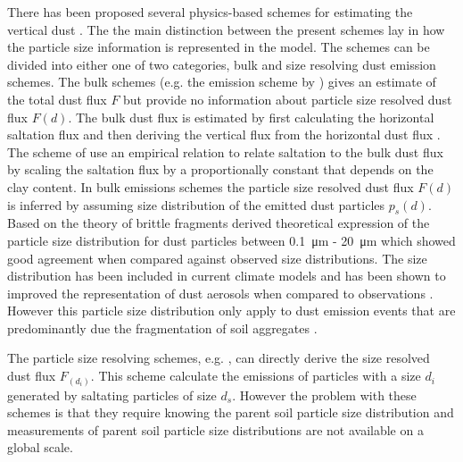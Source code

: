 There has been proposed several physics-based schemes for estimating the vertical dust \parencite{MB95_dust_emission,alfaro2001modeling,shao2004simplification}. The the main distinction between the present schemes lay in how the particle size information is represented in the model. The schemes can be divided into either one of two categories, bulk and size resolving dust emission schemes. The bulk schemes (e.g. the emission scheme by \parencite{MB95_dust_emission}) gives an estimate of the total dust flux $F$ but provide no information about particle size resolved dust flux $F(d)$. The bulk dust flux is estimated by first calculating the horizontal saltation flux and then deriving the vertical flux from the horizontal dust flux \parencite{tegen2014numerical}. The scheme of \textcite{MB95_dust_emission} use an empirical relation to relate saltation to the bulk dust flux by scaling the saltation flux by a proportionally constant that depends on the clay content. In bulk emissions schemes the particle size resolved dust flux $F(d)$ is inferred by assuming size distribution of the emitted dust particles $p_s(d)$. Based on the theory of brittle fragments \textcite{kok_scaling_2011} derived theoretical expression of the particle size distribution for dust particles between \SI{0.1}{\micro\metre} - \SI{20}{\micro\metre} which showed good agreement when compared against observed size distributions. The \textcite{kok_scaling_2011} size distribution has been included in current climate models and has been shown to improved the representation of dust aerosols when compared to observations \parencite{johnson2012global}. However this particle size distribution only apply to dust emission events that are predominantly due the fragmentation of soil aggregates \parencite{kok2012physics}.


The particle size resolving schemes, e.g. \textcite{shao2004simplification}, can directly derive the size resolved dust flux $F_(d_i)$. This scheme calculate the emissions of particles with a size $d_i$ generated by saltating particles of size $d_s$. However the problem with these schemes is that they require knowing the parent soil particle size distribution and measurements of parent soil particle size distributions are not available on a global scale.

